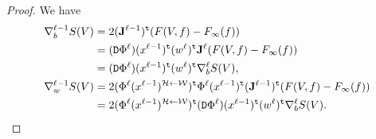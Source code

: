 \documentclass[10pt, a4paper]{article}
\theoremstyle{plain}
\theoremstyle{definition}
\theoremstyle{definition}
\theoremstyle{definition}
\theoremstyle{definition}
\theoremstyle{definition}
\theoremstyle{definition}
\theoremstyle{definition}
\theoremstyle{remark}
\theoremstyle{remark}
\theoremstyle{rudin-style-generic}
\theoremstyle{rudin-style-generic*}
\theoremstyle{rudin-style-theorem}
\begin{document}
  \begin{proof}
    We have
    \begin{align*}
      \nabla^{\ell-1}_b S( V ) &= 2 (\mathbf J^{\ell-1})^{\mathtt t}  ( F(V,f) - F_\infty(f) )\\
                               &= (\mathtt D \Phi^\ell)(x^{\ell-1} )^{\mathtt t} (w^\ell)^{\mathtt t} \mathbf J^\ell (F(V,f) - F_\infty(f) ) \\
                               &= (\mathtt D \Phi^\ell)(x^{\ell-1} )^{\mathtt t} (w^\ell)^{\mathtt t} \nabla^{\ell}_b S( V ) , \\
      \nabla^{\ell-1}_w S( V ) &= 2  (\Phi^{\ell}(x^{\ell-1}) ^{\mathcal H\leftarrow\mathcal W})^{\mathtt t}
                                 \Phi^{\ell}(x^{\ell-1}) ^{\mathtt t}  (\mathbf J^{\ell-1})^{\mathtt t}  ( F(V,f) - F_\infty(f) )\\
                               &=2 (\Phi^{\ell}(x^{\ell-1}) ^{\mathcal H\leftarrow\mathcal W})^{\mathtt t} (\mathtt D \Phi^\ell)(x^{\ell-1} )^{\mathtt t} (w^\ell)^{\mathtt t} \nabla^{\ell}_b S( V )
                                 .
                                 \qedhere
    \end{align*}
  \end{proof}


%   
% 
     
\end{document}
